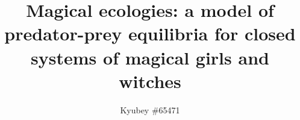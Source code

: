 \documentclass[]{article}
\title{Magical ecologies: a model of predator-prey equilibria for closed systems of magical girls and witches}
\author{Kyubey \#65471}
\begin{document}
\maketitle

\begin{abstract}

\end{abstract}

\section{}
\end{document}
